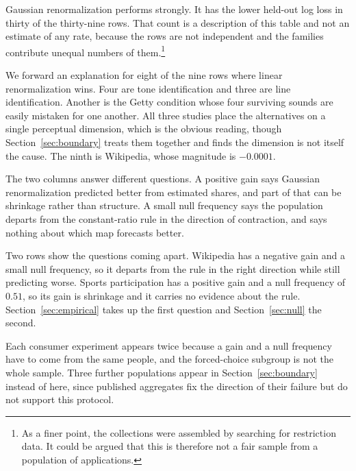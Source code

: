 \documentclass[11pt]{article}
\begin{document}

Gaussian renormalization performs strongly. It has the lower held-out log loss in thirty of the
thirty-nine rows. That count is a description of this table and not an estimate of any rate,
because the rows are not independent and the families contribute unequal numbers of
them.\footnote{As a finer point, the collections were assembled by searching for restriction data.
It could be argued that this is therefore not a fair sample from a population of applications.}

We forward an explanation for eight of the nine rows where linear renormalization wins. Four are
tone identification and three are line identification. Another is the Getty condition whose four
surviving sounds are easily mistaken for one another. All three studies place the alternatives on
a single perceptual dimension, which is the obvious reading, though
Section~\ref{sec:boundary} treats them together and finds the dimension is not itself the cause.
The ninth is Wikipedia, whose magnitude is $-0.0001$.

The two columns answer different questions. A positive gain says Gaussian renormalization
predicted better from estimated shares, and part of that can be shrinkage rather than structure. A
small null frequency says the population departs from the constant-ratio rule in the direction of
contraction, and says nothing about which map forecasts better.

Two rows show the questions coming apart. Wikipedia has a negative gain and a small null
frequency, so it departs from the rule in the right direction while still predicting worse. Sports
participation has a positive gain and a null frequency of $0.51$, so its gain is shrinkage and it
carries no evidence about the rule. Section~\ref{sec:empirical} takes up the first question and
Section~\ref{sec:null} the second.

Each consumer experiment appears twice because a gain and a null frequency have to come from the
same people, and the forced-choice subgroup is not the whole sample. Three further populations
appear in Section~\ref{sec:boundary} instead of here, since published aggregates fix the direction
of their failure but do not support this protocol.
\end{document}
